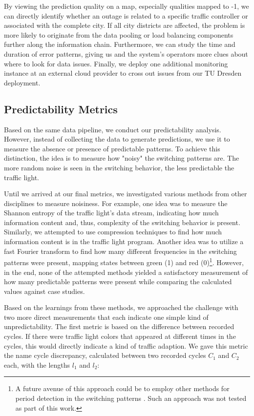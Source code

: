 By viewing the prediction quality on a map, especially qualities mapped to -1, we can directly identify whether an outage is related to a specific traffic controller or associated with the complete city. If all city districts are affected, the problem is more likely to originate from the data pooling or load balancing components further along the information chain. Furthermore, we can study the time and duration of error patterns, giving us and the system's operators more clues about where to look for data issues. Finally, we deploy one additional monitoring instance at an external cloud provider to cross out issues from our TU Dresden deployment.

\subsection{Predictability Metrics}

Based on the same data pipeline, we conduct our predictability analysis. However, instead of collecting the data to generate predictions, we use it to measure the absence or presence of predictable patterns. To achieve this distinction, the idea is to measure how "noisy" the switching patterns are. The more random noise is seen in the switching behavior, the less predictable the traffic light.

Until we arrived at our final metrics, we investigated various methods from other disciplines to measure noisiness. For example, one idea was to measure the Shannon entropy of the traffic light's data stream, indicating how much information content and, thus, complexity of the switching behavior is present. Similarly, we attempted to use compression techniques to find how much information content is in the traffic light program. Another idea was to utilize a fast Fourier transform to find how many different frequencies in the switching patterns were present, mapping states between green (1) and red (0)\footnote{A future avenue of this approach could be to employ other methods for period detection in the switching patterns \cite{breitenbach_method_2023}. Such an approach was not tested as part of this work.}. However, in the end, none of the attempted methods yielded a satisfactory measurement of how many predictable patterns were present while comparing the calculated values against case studies. 

Based on the learnings from these methods, we approached the challenge with two more direct measurements that each indicate one simple kind of unpredictability. The first metric is based on the difference between recorded cycles. If there were traffic light colors that appeared at different times in the cycles, this would directly indicate a kind of traffic adaption. We gave this metric the name cycle discrepancy, calculated between two recorded cycles $C_1$ and $C_2$ each, with the lengths $l_1$ and $l_2$:

